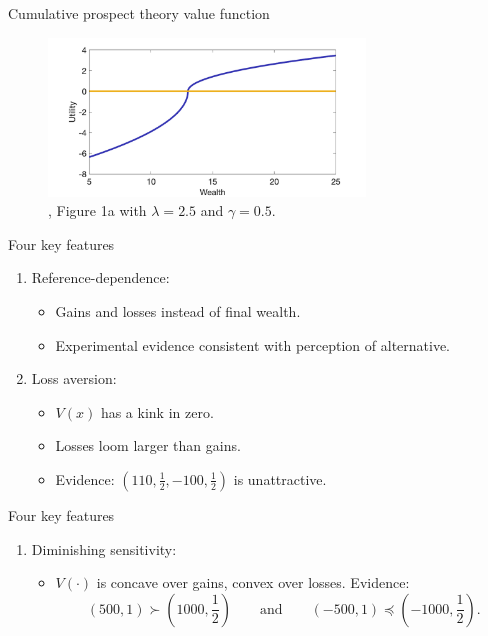 \begin{frame}{Cumulative prospect theory value function}
    \begin{figure}
\centering
\includegraphics[width= 0.75\textwidth]{cpt_utility}
\caption{\citet{Barberis2012a}, Figure 1a with $\lambda = 2.5$ and $\gamma =0.5$.}
    \end{figure}
\end{frame}


\begin{frame}{Four key features}
    \begin{enumerate}[1.]
        \item Reference-dependence:\medskip
            \begin{itemize}
                \item Gains and losses instead of final wealth.\medskip
                \item Experimental evidence consistent with perception of alternative.\medskip
            \end{itemize}\bigskip
        \item Loss aversion:\medskip
            \begin{itemize}
                \item $V(x)$ has a kink in zero.\medskip
                \item Losses loom larger than gains.\medskip
                \item Evidence: $(110,\frac{1}{2},-100,\frac{1}{2})$ is unattractive.
            \end{itemize}
    \end{enumerate}
\end{frame}

\begin{frame}{Four key features}
    \begin{enumerate}[3.]
        \item Diminishing sensitivity:\medskip
            \begin{itemize}
                \item $V(\cdot)$ is concave over gains, convex over losses. Evidence:
               \[(500,1) \succ \left(1000,\frac{1}{2}\right) \qquad \text{and}
                \qquad (-500,1) \preceq  \left(-1000,\frac{1}{2}\right).\]
            \end{itemize}
    \end{enumerate}
\end{frame}

